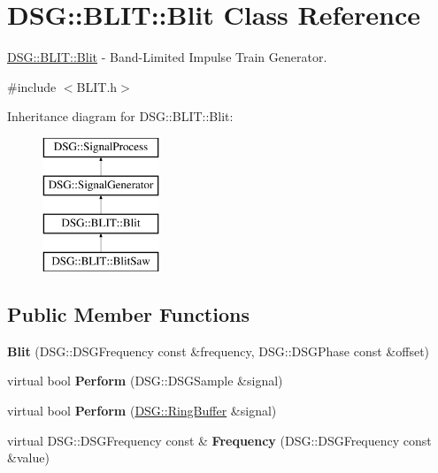 \hypertarget{class_d_s_g_1_1_b_l_i_t_1_1_blit}{\section{D\+S\+G\+:\+:B\+L\+I\+T\+:\+:Blit Class Reference}
\label{class_d_s_g_1_1_b_l_i_t_1_1_blit}
}


\hyperlink{class_d_s_g_1_1_b_l_i_t_1_1_blit}{D\+S\+G\+::\+B\+L\+I\+T\+::\+Blit} -\/ Band-\/\+Limited Impulse Train Generator.  




{\ttfamily \#include $<$B\+L\+I\+T.\+h$>$}

Inheritance diagram for D\+S\+G\+:\+:B\+L\+I\+T\+:\+:Blit\+:\begin{figure}[H]
\begin{center}
\leavevmode
\includegraphics[height=4.000000cm]{class_d_s_g_1_1_b_l_i_t_1_1_blit}
\end{center}
\end{figure}
\subsection*{Public Member Functions}
\begin{DoxyCompactItemize}
\item 
\hypertarget{class_d_s_g_1_1_b_l_i_t_1_1_blit_a8ab0fb1b908d641527bb86a81d1722ba}{{\bfseries Blit} (D\+S\+G\+::\+D\+S\+G\+Frequency const \&frequency, D\+S\+G\+::\+D\+S\+G\+Phase const \&offset)}\label{class_d_s_g_1_1_b_l_i_t_1_1_blit_a8ab0fb1b908d641527bb86a81d1722ba}

\item 
\hypertarget{class_d_s_g_1_1_b_l_i_t_1_1_blit_adfd7c8891b4c4dbd0530a2780781b2bd}{virtual bool {\bfseries Perform} (D\+S\+G\+::\+D\+S\+G\+Sample \&signal)}\label{class_d_s_g_1_1_b_l_i_t_1_1_blit_adfd7c8891b4c4dbd0530a2780781b2bd}

\item 
\hypertarget{class_d_s_g_1_1_b_l_i_t_1_1_blit_aab7c67ff8f059c8367ba316cf8cd5436}{virtual bool {\bfseries Perform} (\hyperlink{class_d_s_g_1_1_ring_buffer}{D\+S\+G\+::\+Ring\+Buffer} \&signal)}\label{class_d_s_g_1_1_b_l_i_t_1_1_blit_aab7c67ff8f059c8367ba316cf8cd5436}

\item 
\hypertarget{class_d_s_g_1_1_b_l_i_t_1_1_blit_a933f8f9f324a4fde4f9e2b69473d88ed}{virtual D\+S\+G\+::\+D\+S\+G\+Frequency const \& {\bfseries Frequency} (D\+S\+G\+::\+D\+S\+G\+Frequency const \&value)}\label{class_d_s_g_1_1_b_l_i_t_1_1_blit_a933f8f9f324a4fde4f9e2b69473d88ed}

\end{DoxyCompactItemize}
